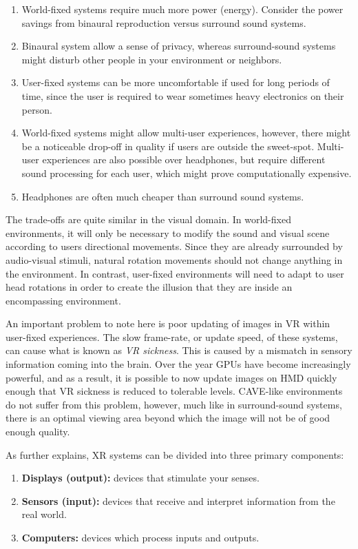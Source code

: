 \begin{enumerate}
    \item World-fixed systems require much more power (energy). Consider the power savings from binaural reproduction versus surround sound systems. 
    \item Binaural system allow a sense of privacy, whereas surround-sound systems might disturb other people in your environment or neighbors. 
    \item User-fixed systems can be more uncomfortable if used for long periods of time, since the user is required to wear sometimes heavy electronics on their person. 
    \item World-fixed systems might allow multi-user experiences, however, there might be a noticeable drop-off in quality if users are outside the sweet-spot. Multi-user experiences are also possible over headphones, but require different sound processing for each user, which might prove computationally expensive.
    \item Headphones are often much cheaper than surround sound systems.
\end{enumerate}

The trade-offs are quite similar in the visual domain. In world-fixed environments, it will only be necessary to modify the sound and visual scene according to users directional movements. Since they are already surrounded by audio-visual stimuli, natural rotation movements should not change anything in the environment. In contrast, user-fixed environments will need to adapt to user head rotations in order to create the illusion that they are inside an encompassing environment. 

An important problem to note here is poor updating of images in VR within user-fixed experiences. The slow frame-rate, or update speed, of these systems, can cause what is known as \textit{VR sickness}. This is caused by a mismatch in sensory information coming into the brain. Over the year GPUs have become increasingly powerful, and as a result, it is possible to now update images on HMD quickly enough that VR sickness is reduced to tolerable levels. CAVE-like environments do not suffer from this problem, however, much like in surround-sound systems, there is an optimal viewing area beyond which the image will not be of good enough quality.

As \cite{lavalle2016virtual} further explains, XR systems can be divided into three primary components:

\begin{enumerate}
    \item \textbf{Displays (output):} devices that stimulate your senses. %
    \item \textbf{Sensors (input):} devices that receive and interpret information from the real world. %
    \item \textbf{Computers:} devices which process inputs and outputs.
\end{enumerate}

